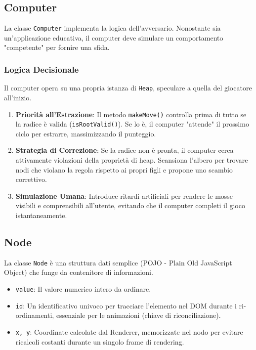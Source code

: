 \documentclass[openany]{theme/uniprthesis}
\begin{document}
\subsection{Computer}
La classe \texttt{Computer} implementa la logica dell'avversario. Nonostante sia un'applicazione educativa, il computer deve simulare un comportamento "competente" per fornire una sfida.

\subsubsection*{Logica Decisionale}
Il computer opera su una propria istanza di \texttt{Heap}, speculare a quella del giocatore all'inizio.
\begin{enumerate}
    \item \textbf{Priorità all'Estrazione}: Il metodo \texttt{makeMove()} controlla prima di tutto se la radice è valida (\texttt{isRootValid()}). Se lo è, il computer "attende" il prossimo ciclo per estrarre, massimizzando il punteggio.
    \item \textbf{Strategia di Correzione}: Se la radice non è pronta, il computer cerca attivamente violazioni della proprietà di heap. Scansiona l'albero per trovare nodi che violano la regola rispetto ai propri figli e propone uno scambio correttivo.
    \item \textbf{Simulazione Umana}: Introduce ritardi artificiali per rendere le mosse visibili e comprensibili all'utente, evitando che il computer completi il gioco istantaneamente.
\end{enumerate}

\subsection{Node}
La classe \texttt{Node} è una struttura dati semplice (POJO - Plain Old JavaScript Object) che funge da contenitore di informazioni.
\begin{itemize}
    \item \texttt{value}: Il valore numerico intero da ordinare.
    \item \texttt{id}: Un identificativo univoco per tracciare l'elemento nel DOM durante i ri-ordinamenti, essenziale per le animazioni (chiave di riconciliazione).
    \item \texttt{x, y}: Coordinate calcolate dal Renderer, memorizzate nel nodo per evitare ricalcoli costanti durante un singolo frame di rendering.
\end{itemize}
\end{document}
